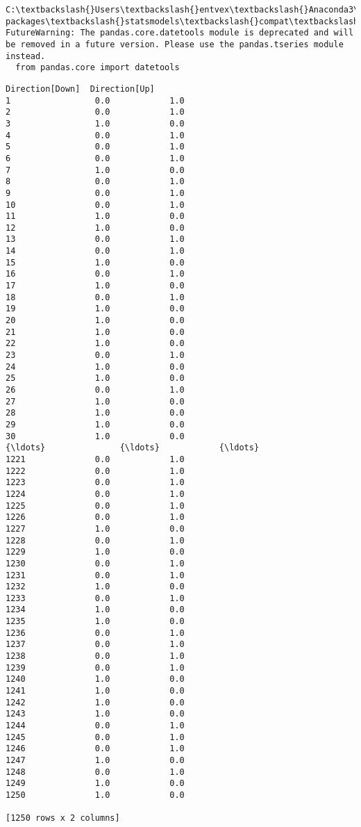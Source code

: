 \documentclass[11pt]{article}
\begin{document}
    \begin{Verbatim}[commandchars=\\\{\}]
C:\textbackslash{}Users\textbackslash{}entvex\textbackslash{}Anaconda3\textbackslash{}lib\textbackslash{}site-packages\textbackslash{}statsmodels\textbackslash{}compat\textbackslash{}pandas.py:56: FutureWarning: The pandas.core.datetools module is deprecated and will be removed in a future version. Please use the pandas.tseries module instead.
  from pandas.core import datetools

    \end{Verbatim}

    \begin{Verbatim}[commandchars=\\\{\}]
      Direction[Down]  Direction[Up]
1                 0.0            1.0
2                 0.0            1.0
3                 1.0            0.0
4                 0.0            1.0
5                 0.0            1.0
6                 0.0            1.0
7                 1.0            0.0
8                 0.0            1.0
9                 0.0            1.0
10                0.0            1.0
11                1.0            0.0
12                1.0            0.0
13                0.0            1.0
14                0.0            1.0
15                1.0            0.0
16                0.0            1.0
17                1.0            0.0
18                0.0            1.0
19                1.0            0.0
20                1.0            0.0
21                1.0            0.0
22                1.0            0.0
23                0.0            1.0
24                1.0            0.0
25                1.0            0.0
26                0.0            1.0
27                1.0            0.0
28                1.0            0.0
29                1.0            0.0
30                1.0            0.0
{\ldots}               {\ldots}            {\ldots}
1221              0.0            1.0
1222              0.0            1.0
1223              0.0            1.0
1224              0.0            1.0
1225              0.0            1.0
1226              0.0            1.0
1227              1.0            0.0
1228              0.0            1.0
1229              1.0            0.0
1230              0.0            1.0
1231              0.0            1.0
1232              1.0            0.0
1233              0.0            1.0
1234              1.0            0.0
1235              1.0            0.0
1236              0.0            1.0
1237              0.0            1.0
1238              0.0            1.0
1239              0.0            1.0
1240              1.0            0.0
1241              1.0            0.0
1242              1.0            0.0
1243              1.0            0.0
1244              0.0            1.0
1245              0.0            1.0
1246              0.0            1.0
1247              1.0            0.0
1248              0.0            1.0
1249              1.0            0.0
1250              1.0            0.0

[1250 rows x 2 columns]

    \end{Verbatim}
\end{document}

